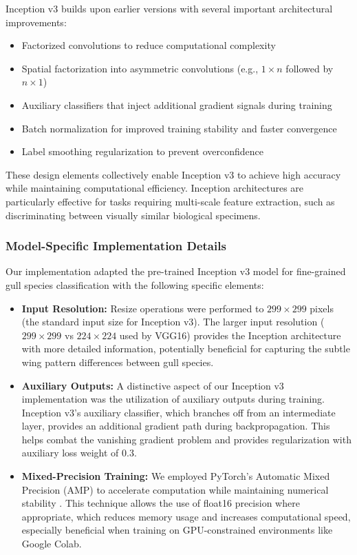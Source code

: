\documentclass[a4paper,12pt]{report}
\begin{document}
Inception v3 builds upon earlier versions with several important architectural improvements:
\begin{itemize}
    \item Factorized convolutions to reduce computational complexity
    \item Spatial factorization into asymmetric convolutions (e.g., $1 \times n$ followed by $n \times 1$)
    \item Auxiliary classifiers that inject additional gradient signals during training
    \item Batch normalization for improved training stability and faster convergence
    \item Label smoothing regularization to prevent overconfidence
\end{itemize}

These design elements collectively enable Inception v3 to achieve high accuracy while maintaining computational efficiency. Inception architectures are particularly effective for tasks requiring multi-scale feature extraction, such as discriminating between visually similar biological specimens.

\subsubsection{Model-Specific Implementation Details}

Our implementation adapted the pre-trained Inception v3 model for fine-grained gull species classification with the following specific elements:

\begin{itemize}
    \item \textbf{Input Resolution:} Resize operations were performed to $299\times299$ pixels (the standard input size for Inception v3). The larger input resolution ($299\times299$ vs $224\times224$ used by VGG16) provides the Inception architecture with more detailed information, potentially beneficial for capturing the subtle wing pattern differences between gull species.
    
    \item \textbf{Auxiliary Outputs:} A distinctive aspect of our Inception v3 implementation was the utilization of auxiliary outputs during training. Inception v3's auxiliary classifier, which branches off from an intermediate layer, provides an additional gradient path during backpropagation. This helps combat the vanishing gradient problem and provides regularization with auxiliary loss weight of 0.3.

    \item \textbf{Mixed-Precision Training:} We employed PyTorch's Automatic Mixed Precision (AMP) to accelerate computation while maintaining numerical stability \citep{micikevicius2018mixed}. This technique allows the use of float16 precision where appropriate, which reduces memory usage and increases computational speed, especially beneficial when training on GPU-constrained environments like Google Colab.
\end{itemize}
\end{document}
